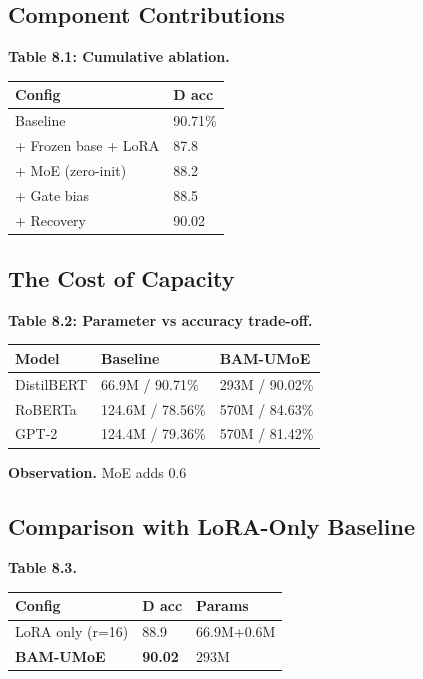 \subsection{Component Contributions}

\textbf{Table 8.1: Cumulative ablation.}

\begin{table}[H]
\centering
\small
\begin{tabular}{ll}
\toprule
\textbf{Config} & \textbf{D acc} \\
\midrule
Baseline & 90.71\% \\
+ Frozen base + LoRA & 87.8 \\
+ MoE (zero-init) & 88.2 \\
+ Gate bias & 88.5 \\
+ Recovery & 90.02 \\
\bottomrule
\end{tabular}
\end{table}

\subsection{The Cost of Capacity}

\textbf{Table 8.2: Parameter vs accuracy trade-off.}

\begin{table}[H]
\centering
\small
\begin{tabular}{lll}
\toprule
\textbf{Model} & \textbf{Baseline} & \textbf{BAM-UMoE} \\
\midrule
DistilBERT & 66.9M / 90.71\% & 293M / 90.02\% \\
RoBERTa & 124.6M / 78.56\% & 570M / 84.63\% \\
GPT-2 & 124.4M / 79.36\% & 570M / 81.42\% \\
\bottomrule
\end{tabular}
\end{table}

\textbf{Observation.} MoE adds 0.6%

\subsection{Comparison with LoRA-Only Baseline}

\textbf{Table 8.3.}

\begin{table}[H]
\centering
\small
\begin{tabular}{lll}
\toprule
\textbf{Config} & \textbf{D acc} & \textbf{Params} \\
\midrule
LoRA only (r=16) & 88.9 & 66.9M+0.6M \\
\textbf{BAM-UMoE} & \textbf{90.02} & 293M \\
\bottomrule
\end{tabular}
\end{table}

